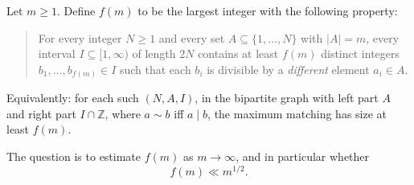 Let $m\ge 1$.  Define $f(m)$ to be the largest integer with the following property:

\begin{quote}
For every integer $N\ge 1$ and every set $A\subseteq\{1,\dots,N\}$ with $|A|=m$, every interval $I\subseteq[1,\infty)$ of length $2N$ contains at least $f(m)$ distinct integers $b_1,\dots,b_{f(m)}\in I$ such that each $b_i$ is divisible by a \emph{different} element $a_i\in A$.
\end{quote}

Equivalently: for each such $(N,A,I)$, in the bipartite graph with left part $A$ and right part $I\cap\mathbb Z$, where $a\sim b$ iff $a\mid b$, the maximum matching has size at least $f(m)$.

The question is to estimate $f(m)$ as $m\to\infty$, and in particular whether
\[
 f(m)\ll m^{1/2}.
\]
